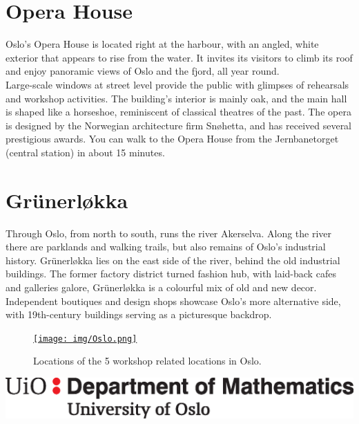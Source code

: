\documentclass{article}
\begin{document}
\vspace{1cm}

\section*{Opera House}
Oslo's Opera House is located right at the harbour, with an angled, white exterior that appears to rise from the water. It invites its visitors to climb its roof and enjoy panoramic views of Oslo and the fjord, all year round. \\
Large-scale windows at street level provide the public with glimpses of rehearsals and workshop activities. The building's interior is mainly oak, and the main hall is shaped like a horseshoe, reminiscent of classical theatres of the past. The opera is designed by the Norwegian architecture firm Snøhetta, and has received several prestigious awards. You can walk to the Opera House from the Jernbanetorget (central station) in about 15 minutes.

\clearpage

\section*{Gr\"unerløkka}
Through Oslo, from north to south, runs the river Akerselva. Along the river there are parklands and walking trails, but also remains of Oslo’s industrial history.
Gr\"unerløkka lies on the east side of the river, behind the old industrial buildings. The former factory district turned fashion hub, with laid-back cafes and galleries galore, Gr\"unerløkka is a colourful mix of old and new decor. Independent boutiques and design shops showcase Oslo’s more alternative side, with 19th-century buildings serving as a picturesque backdrop.

\bigskip
\bigskip

\begin{figure}[h]
    \centering
    \href{https://www.google.com/maps/d/edit?hl=no&hl=no&mid=1q9FpcHekR77D16V4eefgqkybvNc&ll=59.91839077669053%2C10.758429782339476&z=15}{\texttt{[image: img/Oslo.png]}}
    \caption{Locations of the 5 workshop related locations in Oslo.}
    \label{fig:Oslo}
\end{figure}




\clearpage



\includegraphics[scale=0.3]{img/mat-mn-navn-eng.eps}
\end{document}
